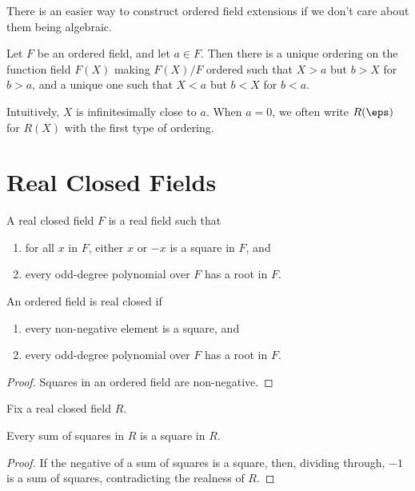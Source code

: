 There is an easier way to construct ordered field extensions if we don't care about them being algebraic.

\begin{lemma}
  \label{lem:order_fun_field}
  Let $F$ be an ordered field, and let $a\in F$. Then there is a unique ordering on the function field $F(X)$ making $F(X)/F$ ordered such that $X>a$ but $b>X$ for $b>a$, and a unique one such that $X<a$ but $b<X$ for $b<a$.
\end{lemma}

Intuitively, $X$ is infinitesimally close to $a$. When $a=0$, we often write $R(\eps)$ for $R(X)$ with the first type of ordering.

\section{Real Closed Fields}

\begin{definition}
  \label{def:RCF}
  \mathlibok
  A real closed field $F$ is a real field such that
  \begin{enumerate}
    \item for all $x$ in $F$, either $x$ or $-x$ is a square in $F$, and
    \item every odd-degree polynomial over $F$ has a root in $F$.
  \end{enumerate}
\end{definition}

\begin{lemma}
  \label{lem:RCF_ord_ax}
  \mathlibok
  An ordered field is real closed if
  \begin{enumerate}
    \item every non-negative element is a square, and
    \item every odd-degree polynomial over $F$ has a root in $F$.
  \end{enumerate}
\end{lemma}
\begin{proof}
  \mathlibok
  Squares in an ordered field are non-negative.
\end{proof}

Fix a real closed field $R$.

\begin{lemma}
  \label{lem:RCF_sumsq_is_sq}
  \leanok
  Every sum of squares in $R$ is a square in $R$.
\end{lemma}
\begin{proof}
  \leanok
  If the negative of a sum of squares is a square, then, dividing through, $-1$ is a sum of squares, contradicting the realness of $R$.
\end{proof}

